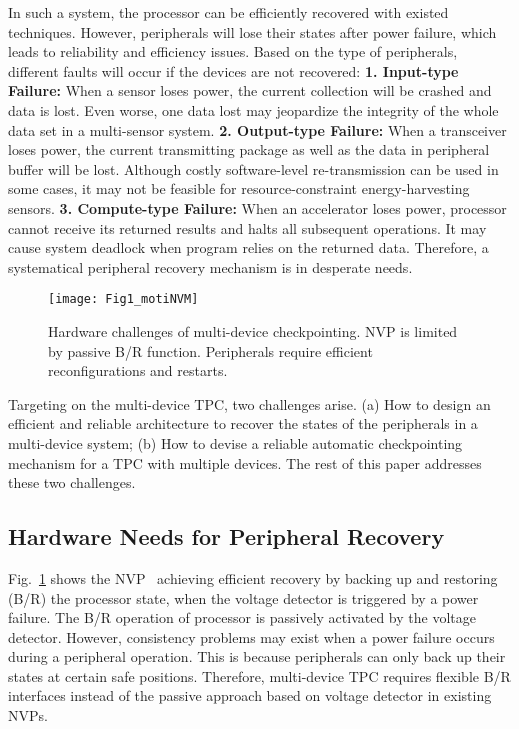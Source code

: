 %
%
In such a system, the processor can be efficiently recovered with existed techniques. 
However, peripherals will lose their states after power failure, which leads to reliability and efficiency issues. 
Based on the type of peripherals, different faults will occur if the devices are not recovered: 
\textbf{1. Input-type Failure:} When a sensor loses power, the current collection will be crashed and data is lost. 
Even worse, one data lost may jeopardize the integrity of the whole data set in a multi-sensor system.
\textbf{2. Output-type Failure:} When a transceiver loses power, the current transmitting package as well as the data in peripheral buffer will be lost. Although costly software-level re-transmission can be used in some cases, it may not be feasible for resource-constraint energy-harvesting sensors. 
\textbf{3. Compute-type Failure:} When an accelerator loses power, processor cannot receive its returned results and halts all subsequent operations.
It may cause system deadlock when program relies on the returned data.
Therefore, a systematical peripheral recovery mechanism is in desperate needs. 

\begin{figure}[t]
    \centering
    \texttt{[image: Fig1\_motiNVM]}
    \vspace{-15pt}
    \caption{Hardware challenges of multi-device checkpointing. NVP is limited by passive B/R function. Peripherals require efficient reconfigurations and restarts.}
    \vspace{-5pt}
    \label{fig:motiNVM}
\end{figure}

Targeting on the multi-device TPC, two challenges arise.
(a) How to design an efficient and reliable architecture to recover the states of the peripherals in a multi-device system;
(b) How to devise a reliable automatic checkpointing mechanism for a TPC with multiple devices.
The rest of this paper addresses these two challenges.

\subsection{Hardware Needs for Peripheral Recovery} \label{sec:motiHW}
\vspace{-5pt}
%
Fig.~\ref{fig:motiNVM} shows the NVP~\cite{wang20123us} achieving efficient recovery by backing up and restoring (B/R) the processor state, when the voltage detector is triggered by a power failure.
The B/R operation of processor is passively activated by the voltage detector.
However, consistency problems may exist when a power failure occurs during a peripheral operation.
This is because peripherals can only back up their states at certain safe positions.
Therefore, multi-device TPC requires flexible B/R interfaces instead of the passive approach based on voltage detector in existing NVPs.

